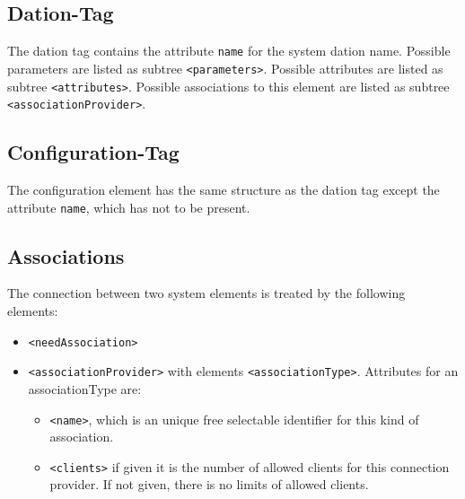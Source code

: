 \subsection{Dation-Tag}
The dation tag contains the attribute \verb|name| for the
system dation name.
Possible parameters are listed as subtree \verb|<parameters>|.
Possible attributes are listed as subtree \verb|<attributes>|.
Possible associations to this element are
 listed as subtree \verb|<associationProvider>|.


\subsection{Configuration-Tag}
The configuration element has the same structure as the dation tag
except the attribute \verb|name|, which has not to be present.

\subsection{Associations}
The connection between two system elements is treated by the following
elements:

\begin{itemize}
\item \verb|<needAssociation>| 
\item \verb|<associationProvider>|  with elements \verb|<associationType>|.
  Attributes for an associationType are:
  \begin{itemize}
   \item  \verb|<name>|,  which is an unique free selectable
     identifier for this kind of  association.
   \item \verb|<clients>|  if given it is the number of allowed
      clients for this connection provider. If not given, there is no
      limits of allowed clients.
   \end{itemize} 
\end{itemize}

